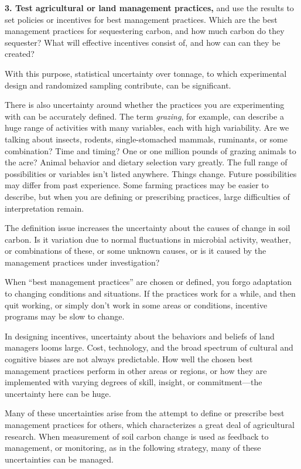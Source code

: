 \documentclass[11pt,letterpaper,oneside,onecolumn]{memoir}
\begin{document}
\textbf{3. Test agricultural or land management practices,} and use the results to set policies or incentives for best management practices. Which are the best management practices for sequestering carbon, and how much carbon do they sequester? What will effective incentives consist of, and how can can they be created?

With this purpose, statistical uncertainty over tonnage, to which experimental design and randomized sampling contribute, can be significant.

There is also uncertainty around whether the practices you are experimenting with can be accurately defined. The term \textit{grazing}, for example, can describe a huge range of activities with many variables, each with high variability. Are we talking about insects, rodents, single-stomached mammals, ruminants, or some combination? Time and timing? One or one million pounds of grazing animals to the acre? Animal behavior and dietary selection vary greatly. The full range of possibilities or variables isn't listed anywhere. Things change. Future possibilities may differ from past experience. Some farming practices may be easier to describe, but when you are defining or prescribing practices, large difficulties of interpretation remain.

The definition issue increases the uncertainty about the causes of change in soil carbon. Is it variation due to normal fluctuations in microbial activity, weather, or combinations of these, or some unknown causes, or is it caused by the management practices under investigation?

When ``best management practices'' are chosen or defined, you forgo adaptation to changing conditions and situations. If the practices work for a while, and then quit working, or simply don't work in some areas or conditions, incentive programs may be slow to change.

In designing incentives, uncertainty about the behaviors and beliefs of land managers looms large. Cost, technology, and the broad spectrum of cultural and cognitive biases are not always predictable. How well the chosen best management practices perform in other areas or regions, or how they are implemented with varying degrees of skill, insight, or commitment---the uncertainty here can be huge.

Many of these uncertainties arise from the attempt to define or prescribe best management practices for others, which characterizes a great deal of agricultural research. When measurement of soil carbon change is used as feedback to management, or monitoring, as in the following strategy, many of these uncertainties can be managed.
\end{document}
